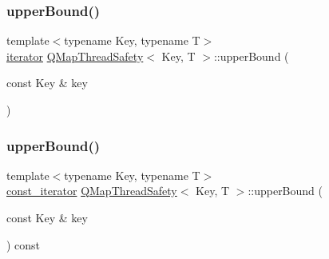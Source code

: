 \mbox{\label{class_q_map_thread_safety_aa43810522d484b2364777e0701486109}} 
\subsubsection{\texorpdfstring{upper\+Bound()}{upperBound()}\hspace{0.1cm}{\footnotesize\ttfamily [1/2]}}
{\footnotesize\ttfamily template$<$typename Key, typename T$>$ \\
\hyperlink{class_q_map_thread_safety_a454c8af3f68e6d61aecaf1b918aa525b}{iterator} \hyperlink{class_q_map_thread_safety}{Q\+Map\+Thread\+Safety}$<$ Key, T $>$\+::upper\+Bound (\begin{DoxyParamCaption}\item[{const Key \&}]{key }\end{DoxyParamCaption})\hspace{0.3cm}{\ttfamily [inline]}}

\mbox{\label{class_q_map_thread_safety_a24c3c21d5d756ff3592a3139a9710995}} 
\subsubsection{\texorpdfstring{upper\+Bound()}{upperBound()}\hspace{0.1cm}{\footnotesize\ttfamily [2/2]}}
{\footnotesize\ttfamily template$<$typename Key, typename T$>$ \\
\hyperlink{class_q_map_thread_safety_aa58d8479729f72b33e305a4d0ca957bd}{const\+\_\+iterator} \hyperlink{class_q_map_thread_safety}{Q\+Map\+Thread\+Safety}$<$ Key, T $>$\+::upper\+Bound (\begin{DoxyParamCaption}\item[{const Key \&}]{key }\end{DoxyParamCaption}) const\hspace{0.3cm}{\ttfamily [inline]}}

\mbox{\label{class_q_map_thread_safety_a3c5caec402261554fd4d73e36e9ca6bc}} 
